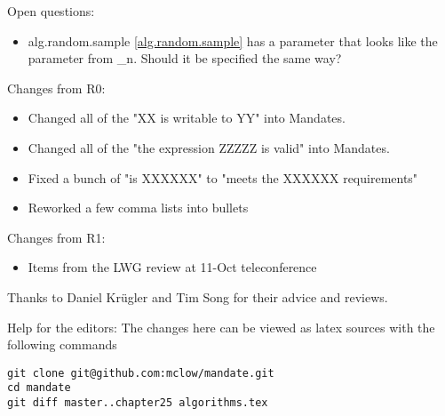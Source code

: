 Open questions:
\begin{itemize}
\item{alg.random.sample \ref{alg.random.sample} has a  parameter that looks like the  parameter from \*_n. Should it be specified the same way?}
\end{itemize}


Changes from R0:
\begin{itemize}
\item{Changed all of the "XX is writable to YY" into Mandates.}
\item{Changed all of the "the expression ZZZZZ is valid" into Mandates.}
\item{Fixed a bunch of "is XXXXXX" to "meets the XXXXXX requirements"}
\item{Reworked a few comma lists into bullets}
\end{itemize}

Changes from R1:
\begin{itemize}
\item{Items from the LWG review at 11-Oct teleconference}
\end{itemize}

Thanks to Daniel Krügler and Tim Song for their advice and reviews.
 
\vfill
Help for the editors: The changes here can be viewed as latex sources with the following commands
\begin{verbatim}
git clone git@github.com:mclow/mandate.git
cd mandate
git diff master..chapter25 algorithms.tex
\end{verbatim}
